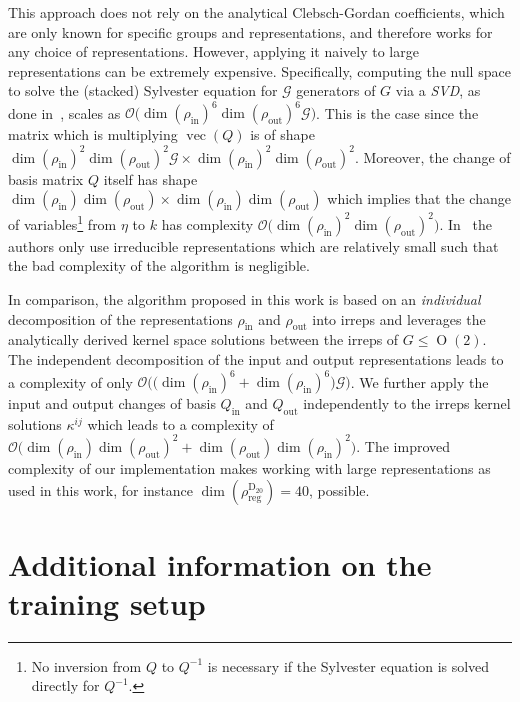 \documentclass{article}
\newcommand{\lp}{\left(}
\newcommand{\rp}{\right)}
\renewcommand{\O}[1]{\ensuremath{\operatorname{O}(#1)}}
\newcommand{\D}[1]{\ensuremath{\operatorname{D}_{#1}}}
\newcommand{\vc}[1]{\ensuremath{\operatorname{vec}\!\lp{#1}\rp}}
\begin{document}
This approach does not rely on the analytical Clebsch-Gordan coefficients, which are only known for specific groups and representations, and therefore works for any choice of representations.
However, applying it naively to large representations can be extremely expensive.
Specifically, computing the null space to solve the (stacked) Sylvester equation for $\mathcal{G}$ generators of $G$ via a \textit{SVD}, as done in~\cite{3d_steerableCNNs}, scales as $\mathcal{O}\big(\dim(\rho_\text{in})^6\dim(\rho_\text{out})^6\mathcal{G}\big)$.
This is the case since the matrix which is multiplying $\vc{Q}$ is of shape
$\dim(\rho_\text{in})^2\dim(\rho_\text{out})^2\mathcal{G} \times \dim(\rho_\text{in})^2\dim(\rho_\text{out})^2$.
Moreover, the change of basis matrix $Q$ itself has shape
$\dim(\rho_\text{in})\dim(\rho_\text{out}) \times \dim(\rho_\text{in})\dim(\rho_\text{out})$
which implies that the change of variables\footnote{No inversion from $Q$ to $Q^{-1}$ is necessary if the Sylvester equation is solved directly for $Q^{-1}$.}
from $\eta$ to $k$ has complexity $\mathcal{O}\big(\dim(\rho_\text{in})^2\dim(\rho_\text{out})^2\big)$.
In~\cite{3d_steerableCNNs} the authors only use irreducible representations which are relatively small such that the bad complexity of the algorithm is negligible.

In comparison, the algorithm proposed in this work is based on an \textit{individual} decomposition of the representations $\rho_\text{in}$ and $\rho_\text{out}$ into irreps and leverages the analytically derived kernel space solutions between the irreps of $G\leq\O2$.
The independent decomposition of the input and output representations leads to a complexity of only
$\mathcal{O}\big(\big(\dim(\rho_\text{in})^6+\dim(\rho_\text{in})^6\big)\mathcal{G}\big)$.
We further apply the input and output changes of basis $Q_\text{in}$ and $Q_\text{out}$ independently to the irreps kernel solutions $\kappa^{ij}$ which leads to a complexity of 
$\mathcal{O}\big(\dim(\rho_\text{in})\dim(\rho_\text{out})^2 + \dim(\rho_\text{out})\dim(\rho_\text{in})^2\big)$.
The improved complexity of our implementation makes working with large representations as used in this work, for instance $\dim(\rho_\text{reg}^{\D{20}})=40$, possible.

 	
\section{Additional information on the training setup}
\label{apx:training_setup}
\end{document}
